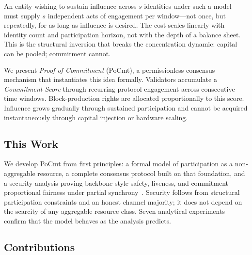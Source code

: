 \documentclass[10pt,journal,twoside]{IEEEtran}
\theoremstyle{remark}
\begin{document}
	An entity wishing to sustain influence across $s$
	identities under such a model must supply $s$ independent
	acts of engagement per window---not once, but repeatedly,
	for as long as influence is desired.
	The cost scales linearly with identity count and
	participation horizon, not with the depth of a balance
	sheet.
	This is the structural inversion that breaks the
	concentration dynamic: capital can be pooled;
	commitment cannot.
	
	We present \emph{Proof of Commitment} (PoCmt), a
	permissionless consensus mechanism that instantiates this
	idea formally.
	Validators accumulate a \emph{Commitment Score} through
	recurring protocol engagement across consecutive time
	windows.
	Block-production rights are allocated proportionally to
	this score.
	Influence grows gradually through sustained participation
	and cannot be acquired instantaneously through capital
	injection or hardware scaling.
	
	\subsection{This Work}
	
	We develop PoCmt from first principles: a formal model
	of participation as a non-aggregable resource, a complete
	consensus protocol built on that foundation, and a security
	analysis proving backbone-style safety, liveness, and
	commitment-proportional fairness under partial
	synchrony~\cite{dwork1988partialsync}.
	Security follows from structural participation constraints
	and an honest channel majority; it does not depend on
	the scarcity of any aggregable resource class.
	Seven analytical experiments confirm that the model
	behaves as the analysis predicts.
	
	\subsection{Contributions}
	
\end{document}
